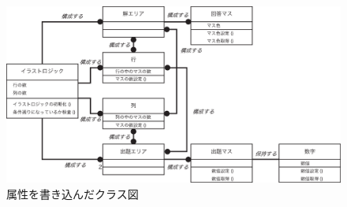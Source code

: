 \documentclass[a4j]{jarticle}
\begin{document}
\begin{figure}[hp]
\centering
\includegraphics[width=15cm]{./image/class-attribute.eps}
\caption{属性を書き込んだクラス図}
\label{fig:class-attribute}
\end{figure}
\end{document}
